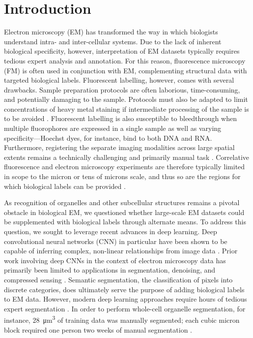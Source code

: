 \section{Introduction}
\label{sec:4.1_intro}

Electron microscopy (EM) has transformed the way in which biologists understand intra- and inter-cellular systems. Due to the lack of inherent biological specificity, however, interpretation of EM datasets typically requires tedious expert analysis and annotation. For this reason, fluorescence microscopy (FM) is often used in conjunction with EM, complementing structural data with targeted biological labels. Fluorescent labelling, however, comes with several drawbacks. Sample preparation protocols are often laborious, time-consuming, and potentially damaging to the sample. Protocols must also be adapted to limit concentrations of heavy metal staining if intermediate processing of the sample is to be avoided \cite{kuipers2015scanning, lane2021optimization}. Fluorescent labelling is also susceptible to bleedthrough when multiple fluorophores are expressed in a single sample as well as varying specificity---Hoechst dyes, for instance, bind to both DNA and RNA. Furthermore, registering the separate imaging modalities across large spatial extents remains a technically challenging and primarily manual task \cite{russell20173d} \needref. Correlative fluorescence and electron microscopy experiments are therefore typically limited in scope to the micron or tens of microns scale, and thus so are the regions for which biological labels can be provided \cite{de2015correlated, russell20173d} \needref.

As recognition of organelles and other subcellular structures remains a pivotal obstacle in biological EM, we questioned whether large-scale EM datasets \cite{de2020large, dittmayer2021preparation} could be supplemented with biological labels through alternate means. To address this question, we sought to leverage recent advances in deep learning. Deep convolutional neural networks (CNN) in particular have been shown to be capable of inferring complex, non-linear relationships from image data \cite{he2016deep, januszewski2018high}. Prior work involving deep CNNs in the context of electron microscopy data has primarily been limited to applications in segmentation, denoising, and compressed sensing \cite{ede2021deep} \needref. Semantic segmentation, the classification of pixels into discrete categories, does ultimately serve the purpose of adding biological labels to EM data. However, modern deep learning approaches require hours of tedious expert segmentation \cite{huang2014identifying, heinrich2018synaptic, liu2020automatic, spiers2021deep}. In order to perform whole-cell organelle segmentation, for instance, \SI{28}{\micro\meter^3} of training data was manually segmented; each cubic micron block required one person two weeks of manual segmentation \cite{heinrich2020automatic}.

